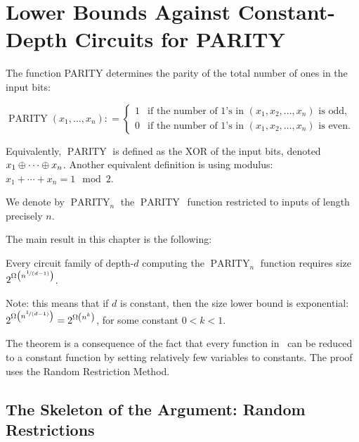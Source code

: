 \newcommand{\Parity}{\ensuremath{\operatorname{PARITY}}}

\section{Lower Bounds Against Constant-Depth Circuits for PARITY}

The function PARITY determines the parity of the total number of ones in the input bits:

\begin{tcolorbox}[colframe=white, colback=gray!11, boxrule=0mm, sharp corners]
$
\Parity(x_1,\dots,x_n): =
\begin{cases} 
1 & \text{if the number of 1's in } (x_1, x_2, \dots, x_n) \text{ is odd}, \\
0 & \text{if the number of 1's in } (x_1, x_2, \dots, x_n) \text{ is even}.
\end{cases}
$
\end{tcolorbox}

Equivalently, $\Parity$ is defined as the XOR of the input bits, denoted $x_1\oplus\cdots\oplus x_n$. Another equivalent definition is using modulus: $x_1+\cdots+x_n = 1 \mod 2$.

We denote by $\Parity_n$ the \Parity\ function restricted to inputs of length precisely $n$.

The main result in this chapter is the following:


\begin{tcolorbox}[colframe=white, colback=blue!11, boxrule=0mm, sharp corners]
\begin{theorem}[\ACZ\ lower bound for \Parity]
\label{thm:ACZ-lower bound}
Every circuit family of depth-$d$ computing the $\Parity_n$ function requires size $2^{\Omega\left(n^{\nicefrac{1}{(d-1)}}\right)}$.
\end{theorem}
\end{tcolorbox}



Note: this means that if $d$ is constant, then the size lower bound is exponential: $2^{\Omega\left(n^{\nicefrac{1}{(d-1)}}\right)}=
2^{\Omega\left(n^k\right)}$, for some constant $0<k<1$.

The theorem is a consequence of the fact that every function in \ACZ\ can be reduced to a constant function by setting relatively few variables to constants.
The proof uses the Random Restriction Method.

\subsection{The Skeleton of the Argument: Random Restrictions}

